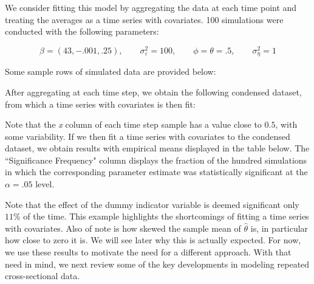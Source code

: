 

We consider fitting this model by aggregating the data at each time point and treating the averages as a time series with covariates. 100 simulations were conducted with the following parameters:

$$ \beta = (43, -.001, .25), \qquad \sigma_\varepsilon^2 = 100, \qquad \phi = \theta = .5, \qquad \sigma_\eta^2 = 1  $$

Some sample rows of simulated data are provided below:




After aggregating at each time step, we obtain the following condensed dataset, from which a time series with covariates is then fit:



Note that the \textit{x} column of each time step sample has a value close to $0.5$, with some variability. If we then fit a time series with covariates to the condensed dataset, we obtain results with empirical means displayed in the table below. The ``Significance Frequency" column displays the fraction of the hundred simulations in which the corresponding parameter estimate was statistically significant at the $\alpha = .05$ level.




Note that the effect of the dummy indicator variable is deemed significant only $11\%$ of the time. This example highlights the shortcomings of fitting a time series with covariates. Also of note is how skewed the sample mean of $\hat{\theta}$ is, in particular how close to zero it is. We will see later why this is actually expected. For now, we use these results to motivate the need for a different approach. With that need in mind, we next review some of the key developments in modeling repeated cross-sectional data.